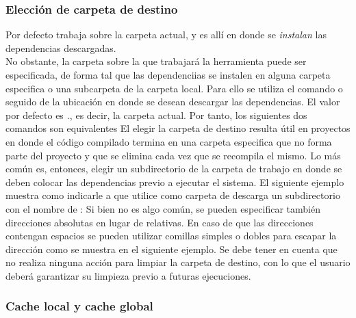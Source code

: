 \subsubsection{Elección de carpeta de destino}
\label{subsubsec:guide:folder}

Por defecto \fronttier trabaja sobre la carpeta actual, y es allí en
donde se \emph{instalan} las dependencias descargadas.\\
No obstante, la carpeta sobre la que trabajará la herramienta puede
ser especificada, de forma tal que las dependenciias se instalen en alguna carpeta
especifica o una subcarpeta de la carpeta local. Para ello se
utiliza el comando  o  seguido de la ubicación
en donde se desean descargar las dependencias.
El valor por defecto es \emph{.}, es decir, la carpeta
actual. Por tanto, los siguientes dos comandos son equivalentes
El elegir la carpeta de destino resulta útil en proyectos en donde
el código compilado termina en una carpeta especifica que no forma
parte del proyecto y que se elimina cada vez que se recompila el mismo.
Lo más común es, entonces, elegir un subdirectorio de la carpeta de trabajo
en donde se deben colocar las dependencias previo a ejecutar el sistema.
El siguiente ejemplo muestra como indicarle a \fronttier que utilice
como carpeta de descarga un subdirectorio con el nombre de
:
Si bien no es algo común, se pueden especificar también direcciones
absolutas en lugar de relativas. En caso de que las direcciones
contengan espacios se pueden utilizar comillas simples o dobles para
escapar la dirección como se muestra en el siguiente ejemplo.
Se debe tener en cuenta que \fronttier no realiza ninguna
acción para limpiar la carpeta de destino, con lo que el
usuario deberá garantizar su limpieza previo a futuras
ejecuciones.

\subsubsection{Cache local y cache global}
\label{subsubsec:guide:localmode}

